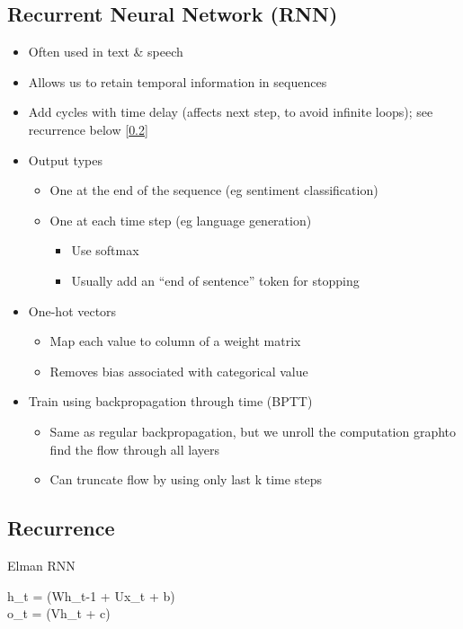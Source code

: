 \documentclass[12pt]{article}
\newenvironment{eqn}{\equation\alignedat{3}}{\endalignedat\endequation}
\begin{document}
\subsection{Recurrent Neural Network (RNN)}

\begin{itemize}
	\item Often used in text \& speech
	\item Allows us to retain temporal information in sequences
	\item Add cycles with time delay (affects next step, to avoid infinite loops); see recurrence below [\ref{sec:recurrence}]
	\item Output types
	\begin{itemize}
		\item One at the end of the sequence (eg sentiment classification)
		\item One at each time step (eg language generation)
		\begin{itemize}
			\item Use softmax 
			\item Usually add an ``end of sentence'' token for stopping
		\end{itemize}
	\end{itemize}
	\item One-hot vectors
	\begin{itemize}
		\item Map each value to column of a weight matrix 
		\item Removes bias associated with categorical value
	\end{itemize}
	\item Train using backpropagation through time (BPTT)
	\begin{itemize}
		\item Same as regular backpropagation, but we unroll the computation graphto find the flow through all layers 
		\item Can truncate flow by using only last k time steps
	\end{itemize}
\end{itemize}

\subsection{Recurrence}
\label{sec:recurrence}

Elman RNN 

\begin{eqn}
	h_t = \sigma(Wh_{t-1} + Ux_t + b) \\ 
	o_t = \phi(Vh_t + c)
\end{eqn}
\end{document}
